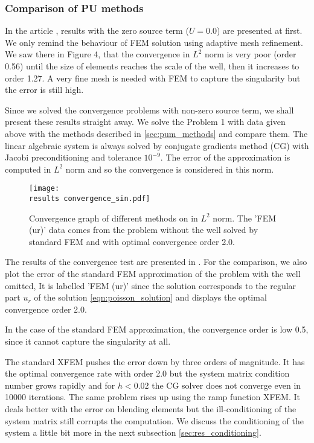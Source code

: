 \subsubsection{Comparison of PU methods} \label{sec:res_comparison}

In the article \cite{exner_2016}, results with the zero source term ($U=0.0$) are presented at first. We only
remind the behaviour of FEM solution using adaptive mesh refinement.
We saw there in Figure 4, that the convergence in $L^2$ norm is very poor (order 0.56) until the size of elements 
reaches the scale of the well, then it increases to order 1.27. A very fine mesh is needed with FEM to capture 
the singularity but the error is still high.

Since we solved the convergence problems with non-zero source term, we shall present these results straight away.
We solve the Problem 1 with data given above with the methods described in \ref{sec:pum_methods} and compare them.
The linear algebraic system is always solved by conjugate gradients method (CG) with Jacobi preconditioning 
and tolerance $10^{-9}$. The error of the approximation is computed in $L^2$ norm and so the convergence is
considered in this norm.

\begin{figure}[!htb]
  \centering    
  \texttt{[image: \\results convergence\_sin.pdf]}
  \caption[Convergence graph]{Convergence graph of different methods on in $L^2$ norm. The 'FEM (ur)'
  data comes from the problem without the well solved by standard FEM and with optimal convergence order 2.0.}
  \label{fig:convergence_sin}
\end{figure}

The results of the convergence test are presented in .
For the comparison, we also plot the error of the standard FEM approximation of the problem with the well omitted, 
It is labelled 'FEM (ur)' since the solution corresponds to the regular part $u_r$ of the solution \eqref{eqn:poisson_solution}  
and displays the optimal convergence order 2.0.

In the case of the standard FEM approximation, the convergence order is low 0.5, since it cannot capture the 
singularity at all.

The standard XFEM pushes the error down by three orders of magnitude. It has the optimal convergence rate with order 2.0 but the system
matrix condition number grows rapidly and for $h<0.02$ the CG solver does not converge even in 10000 iterations. The same
problem rises up using the ramp function XFEM. It deals better with the error on blending elements but the
ill-conditioning of the system matrix still corrupts the computation. We discuss the conditioning of the system 
a little bit more in the next subsection \ref{sec:res_conditioning}.

